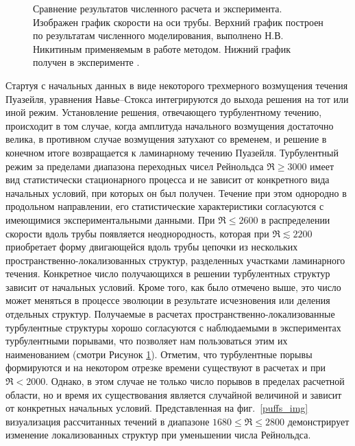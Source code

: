 \begin{figure}[h]
\caption{Сравнение результатов численного расчета и эксперимента. Изображен график скорости на оси трубы. Верхний график построен по результатам численного моделирования, выполнено Н.В. Никитиным применяемым в работе методом. Нижний график получен в эксперименте \cite{Wygnanski1973}.}
\label{exper_img}
\end{figure}

Стартуя с начальных данных в виде некоторого трехмерного возмущения течения Пуазейля, уравнения Навье--Стокса интегрируются до выхода решения на тот или иной режим. Установление решения, отвечающего турбулентному течению, происходит в том случае, когда амплитуда начального возмущения достаточно велика, в противном случае возмущения затухают со временем, и решение в конечном итоге возвращается к ламинарному течению Пуазейля. Турбулентный режим за пределами диапазона переходных чисел Рейнольдса $\Re \geqslant 3000$ имеет вид статистически стационарного процесса и не зависит от конкретного вида начальных условий, при которых он был получен. Течение при этом однородно в продольном направлении, его статистические характеристики согласуются с имеющимися экспериментальными данными. При $\Re \leqslant 2600$ в распределении скорости вдоль трубы появляется неоднородность, которая при $\Re \lesssim 2200$ приобретает форму двигающейся вдоль трубы цепочки из нескольких пространственно-локализованных структур, разделенных участками ламинарного течения. Конкретное число получающихся в решении турбулентных структур зависит от начальных условий. Кроме того, как было отмечено выше, это число может меняться в процессе эволюции в результате исчезновения или деления отдельных структур. Получаемые в расчетах пространственно-локализованные турбулентные структуры хорошо согласуются с наблюдаемыми в экспериментах турбулентными порывами, что позволяет нам пользоваться этим их наименованием (смотри Рисунок \ref{exper_img}). Отметим, что турбулентные порывы формируются и на некотором отрезке времени существуют в расчетах и при $\Re < 2000$. Однако, в этом случае не только число порывов в пределах расчетной области, но и время их существования является случайной величиной и зависит от конкретных начальных условий. Представленная на фиг.~\ref{puffs_img} визуализация рассчитанных течений в диапазоне $1680 \leqslant \Re \leqslant 2800$ демонстрирует изменение локализованных структур при уменьшении числа Рейнольдса.

